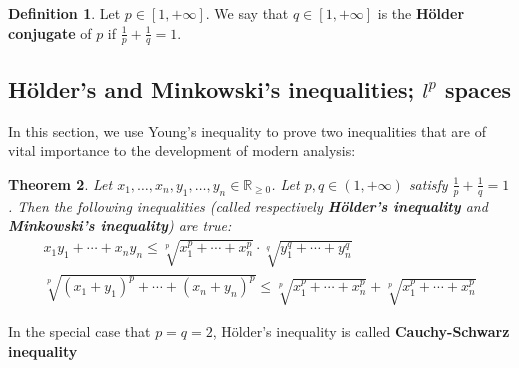 \documentclass[12pt,b5paper,notitlepage]{article}
\theoremstyle{definition}
\newtheorem{df}{Definition}[section]
\theoremstyle{plain}
\newtheorem{thm}[df]{Theorem}
\newcommand{\Rbb}{\mathbb R}
\numberwithin{equation}{section}
\begin{document}
\begin{df}
Let $p\in[1,+\infty]$. We say that $q\in[1,+\infty]$ is the \textbf{H\"older conjugate}  of $p$ if $\frac 1p+\frac 1q=1$.
\end{df}






\subsection{H\"older's and Minkowski's inequalities; $l^p$ spaces}



In this section, we use Young's inequality to prove two inequalities that are of vital importance to the development of modern analysis:





\begin{thm}
Let $x_1,\dots,x_n,y_1,\dots,y_n\in\Rbb_{\geq0}$. Let $p,q\in(1,+\infty)$ satisfy $\frac 1p+\frac 1q=1$. Then the following inequalities (called respectively \textbf{H\"older's inequality}  and  \textbf{Minkowski's inequality}) are true:
\begin{subequations}
\begin{gather}
x_1y_1+\cdots+x_ny_n\leq\sqrt[p]{x_1^p+\cdots+x_n^p}\cdot\sqrt[q]{y_1^q+\cdots+y_n^q}\\
\sqrt[p]{(x_1+y_1)^p+\cdots+(x_n+y_n)^p}\leq  \sqrt[p]{x_1^p+\cdots+x_n^p}+\sqrt[p]{x_1^p+\cdots+x_n^p}
\end{gather}
\end{subequations}
\end{thm}


In the special case that $p=q=2$, H\"older's inequality is called \textbf{Cauchy-Schwarz inequality}
\end{document}
